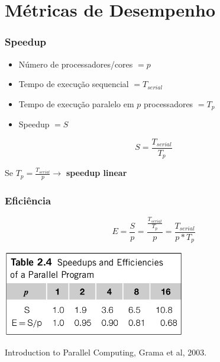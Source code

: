 \documentclass[xcolor={usenames,dvipsnames},12pt,presentation,aspectratio=169]{beamer}
\begin{document}
\section{Métricas de Desempenho}
\begin{frame}[fragile]
  \frametitle{Speedup}
\begin{itemize}
  \item Número de processadores/cores $= p$
  \item Tempo de execução sequencial $= T_{serial}$
  \item Tempo de execução paralelo em $p$ processadores $= T_p$
  \item Speedup $= S$
\end{itemize}
  \begin{equation*}
    S = \frac{T_{serial}}{T_{p}}
  \end{equation*}
  \begin{center}
    Se $T_p = \frac{T_{serial}}{p} \rightarrow$ \textbf{speedup linear}
  \end{center}
\end{frame}
\begin{frame}[fragile]
  \frametitle{Eficiência}
  \begin{center}
    \begin{equation*}
      E = \frac{S}{p} = \frac{\frac{T_{serial}}{T_p}}{p} = \frac{T_{serial}}{p * T_p}
    \end{equation*}
  \end{center}
   \begin{center}
 	\includegraphics[width=0.6\textwidth]{speedup1.png}
   \end{center}
   \vfill
   {\tiny Introduction to Parallel Computing, Grama et al, 2003.}
\end{frame}
\end{document}

